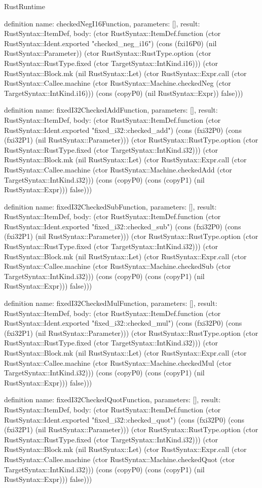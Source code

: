 \begin{lexlean}{RustRuntime}
\begin{semanticmodule}
definition{
  name: checkedNegI16Function,
  parameters: [],
  result: RustSyntax::ItemDef,
  body: (ctor RustSyntax::ItemDef.function (ctor RustSyntax::Ident.exported "checked_neg_i16") (cons (fxi16P0) (nil RustSyntax::Parameter)) (ctor RustSyntax::RustType.option (ctor RustSyntax::RustType.fixed (ctor TargetSyntax::IntKind.i16))) (ctor RustSyntax::Block.mk (nil RustSyntax::Let) (ctor RustSyntax::Expr.call (ctor RustSyntax::Callee.machine (ctor RustSyntax::Machine.checkedNeg (ctor TargetSyntax::IntKind.i16))) (cons (copyP0) (nil RustSyntax::Expr)) false)))
}

definition{
  name: fixedI32CheckedAddFunction,
  parameters: [],
  result: RustSyntax::ItemDef,
  body: (ctor RustSyntax::ItemDef.function (ctor RustSyntax::Ident.exported "fixed_i32::checked_add") (cons (fxi32P0) (cons (fxi32P1) (nil RustSyntax::Parameter))) (ctor RustSyntax::RustType.option (ctor RustSyntax::RustType.fixed (ctor TargetSyntax::IntKind.i32))) (ctor RustSyntax::Block.mk (nil RustSyntax::Let) (ctor RustSyntax::Expr.call (ctor RustSyntax::Callee.machine (ctor RustSyntax::Machine.checkedAdd (ctor TargetSyntax::IntKind.i32))) (cons (copyP0) (cons (copyP1) (nil RustSyntax::Expr))) false)))
}

definition{
  name: fixedI32CheckedSubFunction,
  parameters: [],
  result: RustSyntax::ItemDef,
  body: (ctor RustSyntax::ItemDef.function (ctor RustSyntax::Ident.exported "fixed_i32::checked_sub") (cons (fxi32P0) (cons (fxi32P1) (nil RustSyntax::Parameter))) (ctor RustSyntax::RustType.option (ctor RustSyntax::RustType.fixed (ctor TargetSyntax::IntKind.i32))) (ctor RustSyntax::Block.mk (nil RustSyntax::Let) (ctor RustSyntax::Expr.call (ctor RustSyntax::Callee.machine (ctor RustSyntax::Machine.checkedSub (ctor TargetSyntax::IntKind.i32))) (cons (copyP0) (cons (copyP1) (nil RustSyntax::Expr))) false)))
}

definition{
  name: fixedI32CheckedMulFunction,
  parameters: [],
  result: RustSyntax::ItemDef,
  body: (ctor RustSyntax::ItemDef.function (ctor RustSyntax::Ident.exported "fixed_i32::checked_mul") (cons (fxi32P0) (cons (fxi32P1) (nil RustSyntax::Parameter))) (ctor RustSyntax::RustType.option (ctor RustSyntax::RustType.fixed (ctor TargetSyntax::IntKind.i32))) (ctor RustSyntax::Block.mk (nil RustSyntax::Let) (ctor RustSyntax::Expr.call (ctor RustSyntax::Callee.machine (ctor RustSyntax::Machine.checkedMul (ctor TargetSyntax::IntKind.i32))) (cons (copyP0) (cons (copyP1) (nil RustSyntax::Expr))) false)))
}

definition{
  name: fixedI32CheckedQuotFunction,
  parameters: [],
  result: RustSyntax::ItemDef,
  body: (ctor RustSyntax::ItemDef.function (ctor RustSyntax::Ident.exported "fixed_i32::checked_quot") (cons (fxi32P0) (cons (fxi32P1) (nil RustSyntax::Parameter))) (ctor RustSyntax::RustType.option (ctor RustSyntax::RustType.fixed (ctor TargetSyntax::IntKind.i32))) (ctor RustSyntax::Block.mk (nil RustSyntax::Let) (ctor RustSyntax::Expr.call (ctor RustSyntax::Callee.machine (ctor RustSyntax::Machine.checkedQuot (ctor TargetSyntax::IntKind.i32))) (cons (copyP0) (cons (copyP1) (nil RustSyntax::Expr))) false)))
}


\end{semanticmodule}
\end{lexlean}

